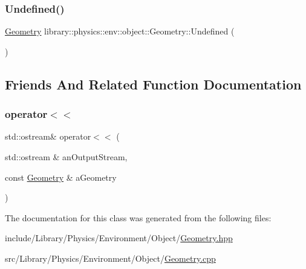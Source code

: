 \subsubsection{\texorpdfstring{Undefined()}{Undefined()}}
{\footnotesize\ttfamily \hyperlink{classlibrary_1_1physics_1_1env_1_1object_1_1_geometry}{Geometry} library\+::physics\+::env\+::object\+::\+Geometry\+::\+Undefined (\begin{DoxyParamCaption}{ }\end{DoxyParamCaption})\hspace{0.3cm}{\ttfamily [static]}}



\subsection{Friends And Related Function Documentation}
\mbox{\label{classlibrary_1_1physics_1_1env_1_1object_1_1_geometry_aebfe5b9b5d8cd3dd8a2cfd140a1df583}} 
\subsubsection{\texorpdfstring{operator$<$$<$}{operator<<}}
{\footnotesize\ttfamily std\+::ostream\& operator$<$$<$ (\begin{DoxyParamCaption}\item[{std\+::ostream \&}]{an\+Output\+Stream,  }\item[{const \hyperlink{classlibrary_1_1physics_1_1env_1_1object_1_1_geometry}{Geometry} \&}]{a\+Geometry }\end{DoxyParamCaption})\hspace{0.3cm}{\ttfamily [friend]}}



The documentation for this class was generated from the following files\+:\begin{DoxyCompactItemize}
\item 
include/\+Library/\+Physics/\+Environment/\+Object/\hyperlink{_geometry_8hpp}{Geometry.\+hpp}\item 
src/\+Library/\+Physics/\+Environment/\+Object/\hyperlink{_geometry_8cpp}{Geometry.\+cpp}\end{DoxyCompactItemize}
